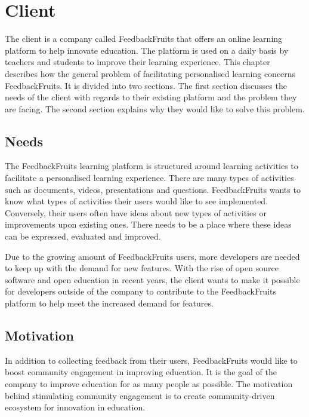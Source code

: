 \chapter{Client}

The client is a company called FeedbackFruits that offers an online learning platform to help innovate education. The platform is used on a daily basis by teachers and students to improve their learning experience. This chapter describes how the general problem of facilitating personalised learning concerns FeedbackFruits. It is divided into two sections. The first section discusses the needs of the client with regards to their existing platform and the problem they are facing. The second section explains why they would like to solve this problem.

\section{Needs}

The FeedbackFruits learning platform is structured around learning activities to facilitate a personalised learning experience. There are many types of activities such as documents, videos, presentations and questions. FeedbackFruits wants to know what types of activities their users would like to see implemented. Conversely, their users often have ideas about new types of activities or improvements upon existing ones. There needs to be a place where these ideas can be expressed, evaluated and improved.

Due to the growing amount of FeedbackFruits users, more developers are needed to keep up with the demand for new features. With the rise of open source software and open education in recent years, the client wants to make it possible for developers outside of the company to contribute to the FeedbackFruits platform to help meet the increased demand for features.

\section{Motivation}

In addition to collecting feedback from their users, FeedbackFruits would like to boost community engagement in improving education. It is the goal of the company to improve education for as many people as possible. The motivation behind stimulating community engagement is to create community-driven ecosystem for innovation in education.